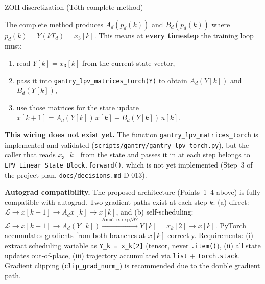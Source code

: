 \documentclass[11pt]{article}
\newcounter{derivstep}
\newenvironment{derivationstep}[1]
{
    \refstepcounter{derivstep}
    \begin{stepbox}{#1}
}
{
    \end{stepbox}
}
\begin{document}
\begin{derivationstep}{ZOH discretization (Tóth complete method)}
\begin{tcolorbox}[
    colback=red!4, colframe=red!60!black, boxrule=0.9pt, arc=1.5mm,
    left=2mm, right=2mm, top=1mm, bottom=1mm,
    title={\bfseries Implementation requirement: scheduling wiring not yet done},
    coltitle=black, colbacktitle=red!15, fonttitle=\bfseries
]
The complete method produces $A_d(p_d(k))$ and $B_d(p_d(k))$ where
$p_d(k) = Y(kT_d) = x_3[k]$. This means at \textbf{every timestep} the training loop must:
\begin{enumerate}
    \item read $Y[k] = x_3[k]$ from the current state vector,
    \item pass it into \texttt{gantry\_lpv\_matrices\_torch(Y)} to obtain $A_d(Y[k])$
          and $B_d(Y[k])$,
    \item use those matrices for the state update $x[k+1] = A_d(Y[k])\,x[k] + B_d(Y[k])\,u[k]$.
\end{enumerate}
\textbf{This wiring does not exist yet.} The function
\texttt{gantry\_lpv\_matrices\_torch} is implemented and validated
(\texttt{scripts/gantry/gantry\_lpv\_torch.py}), but the caller that reads $x_3[k]$ from
the state and passes it in at each step belongs to \texttt{LPV\_Linear\_State\_Block.forward()},
which is not yet implemented (Step~3 of the project plan,
\texttt{docs/decisions.md} D-013).

\medskip
\textbf{Autograd compatibility.}
The proposed architecture (Points~1--4 above) is fully compatible with autograd.
Two gradient paths exist at each step $k$:
(a) direct: $\mathcal{L} \to x[k+1] \to A_d x[k] \to x[k]$, and
(b) self-scheduling: $\mathcal{L} \to x[k+1] \to A_d(Y[k]) \xrightarrow{\partial\,\mathrm{matrix\_exp}/\partial Y} Y[k] = x_k[2] \to x[k]$.
PyTorch accumulates gradients from both branches at $x[k]$ correctly.
Requirements: (i) extract scheduling variable as \texttt{Y\_k = x\_k[2]} (tensor, never \texttt{.item()}),
(ii) all state updates out-of-place, (iii) trajectory accumulated via \texttt{list} + \texttt{torch.stack}.
Gradient clipping (\texttt{clip\_grad\_norm\_}) is recommended due to the double gradient path.

\end{tcolorbox}

\end{derivationstep}
\end{document}
